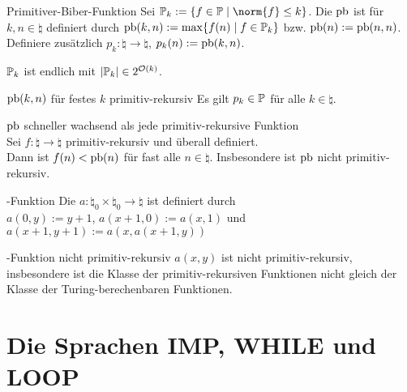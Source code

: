 \begin{Def}{Primitiver-Biber-Funktion}
    Sei $\pr_k := \{f \in \pr \;|\; \norm{f} \le k\}$.
    Die  $\text{pb}$ ist für $k, n \in \natural$ definiert durch
    $\text{pb}(k, n) := \max\{f(n) \;|\; f \in \mathbb{P}_k\}$ bzw.
    $\text{pb}(n) := \text{pb}(n, n)$.\\
    Definiere zusätzlich $p_k\colon \natural \rightarrow \natural$, $p_k(n) := \text{pb}(k, n)$.
\end{Def}

\begin{Bem}
    $\mathbb{P}_k$ ist endlich mit $|\mathbb{P}_k| \in 2^{\mathcal{O}(k)}$.
\end{Bem}

\begin{Satz}{$\text{pb}(k, n)$ für festes $k$ primitiv-rekursiv}
    Es gilt $p_k \in \mathbb{P}$ für alle $k \in \natural$.
\end{Satz}

\begin{Satz}{$\text{pb}$ schneller wachsend als jede primitiv-rekursive Funktion}\\
    Sei $f\colon \natural \rightarrow \natural$ primitiv-rekursiv und überall definiert.\\
    Dann ist $f(n) < \text{pb}(n)$ für fast alle $n \in \natural$.
    Insbesondere ist $\text{pb}$ nicht primitiv-rekursiv.
\end{Satz}

\linie

\begin{Def}{-Funktion}
    Die 
    $a\colon \natural_0 \times \natural_0 \rightarrow \natural$ ist definiert durch\\
    $a(0, y) := y + 1$, $a(x + 1, 0) := a(x, 1)$ und
    $a(x + 1, y + 1) := a(x, a(x + 1, y))$
\end{Def}

\begin{Satz}{-Funktion nicht primitiv-rekursiv}
    $a(x, y)$ ist nicht primitiv-rekursiv, insbesondere ist die Klasse der
    primitiv-rekursiven Funktionen nicht gleich der Klasse der Turing-berechenbaren Funktionen.
\end{Satz}

\pagebreak

\section{%
    Die Sprachen IMP, WHILE und LOOP%
}

